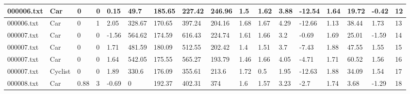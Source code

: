 \documentclass[a4paper, 11pt]{article}
\begin{document}
\begin{multicols}{2}
\begin{table*}[!ht]
\begin{subtable}[c]{\linewidth}
{\begin{tabular}{|l|l|l|l|l|l|l|l|l|l|l|l|l|l|l|l|l|}
        000006.txt & Car & 0 & 0 & 0.15 & 49.7 & 185.65 & 227.42 & 246.96 & 1.5 & 1.62 & 3.88 & -12.54 & 1.64 & 19.72 & -0.42 & 12 \\ \hline
        000006.txt & Car & 0 & 1 & 2.05 & 328.67 & 170.65 & 397.24 & 204.16 & 1.68 & 1.67 & 4.29 & -12.66 & 1.13 & 38.44 & 1.73 & 13 \\ \hline
        000007.txt & Car & 0 & 0 & -1.56 & 564.62 & 174.59 & 616.43 & 224.74 & 1.61 & 1.66 & 3.2 & -0.69 & 1.69 & 25.01 & -1.59 & 14 \\ \hline
        000007.txt & Car & 0 & 0 & 1.71 & 481.59 & 180.09 & 512.55 & 202.42 & 1.4 & 1.51 & 3.7 & -7.43 & 1.88 & 47.55 & 1.55 & 15 \\ \hline
        000007.txt & Car & 0 & 0 & 1.64 & 542.05 & 175.55 & 565.27 & 193.79 & 1.46 & 1.66 & 4.05 & -4.71 & 1.71 & 60.52 & 1.56 & 16 \\ \hline
        000007.txt & Cyclist & 0 & 0 & 1.89 & 330.6 & 176.09 & 355.61 & 213.6 & 1.72 & 0.5 & 1.95 & -12.63 & 1.88 & 34.09 & 1.54 & 17 \\ \hline
        000008.txt & Car & 0.88 & 3 & -0.69 & 0 & 192.37 & 402.31 & 374 & 1.6 & 1.57 & 3.23 & -2.7 & 1.74 & 3.68 & -1.29 & 18 \\ \hline
    \end{tabular}
}
\label{tab:snip_proc_data_id}
\end{subtable}


\end{table*}
\end{multicols}
\end{document}

